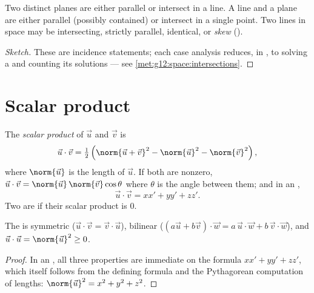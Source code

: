 \begin{proposition}\label{prop:g12:space:positions}
Two distinct planes are either parallel or intersect in a line. A line and a
plane are either parallel (possibly contained) or intersect in a single
point. Two lines in space may be intersecting, strictly parallel, identical,
or \emph{skew} ().
\end{proposition}

\begin{proof}[Sketch]
These are incidence statements; each case analysis reduces, in ,
to solving a  and counting its solutions --- see
\cref{met:g12:space:intersections}.
\end{proof}

\section{Scalar product}

\begin{definition}\label{def:g12:space:dot}
The \emph{scalar product} of $\vec u$ and $\vec v$ is
\[
\vec u \cdot \vec v = \tfrac12\left(\norm{\vec u + \vec v}^2
- \norm{\vec u}^2 - \norm{\vec v}^2\right),
\]
where $\norm{\vec u}$ is the length of $\vec u$. If both  are
nonzero, $\vec u \cdot \vec v = \norm{\vec u}\,\norm{\vec v}\cos\theta$
where $\theta$ is the angle between them; and in an \emph{}
,
\[
\vec u \cdot \vec v = xx' + yy' + zz' .
\]
Two  are \emph{} if their scalar product is $0$.
\end{definition}

\begin{proposition}[Properties]\label{prop:g12:space:dotprops}
The  is symmetric ($\vec u\cdot\vec v = \vec v\cdot\vec u$),
bilinear ($(a\vec u + b\vec v)\cdot \vec w = a\,\vec u\cdot\vec w +
b\,\vec v\cdot \vec w$), and
$\vec u \cdot \vec u = \norm{\vec u}^2 \geq 0$.
\end{proposition}

\begin{proof}
In an , all three properties are immediate on the formula
$xx' + yy' + zz'$, which itself follows from the defining formula and the
Pythagorean computation of lengths:
$\norm{\vec u}^2 = x^2 + y^2 + z^2$.
\end{proof}

